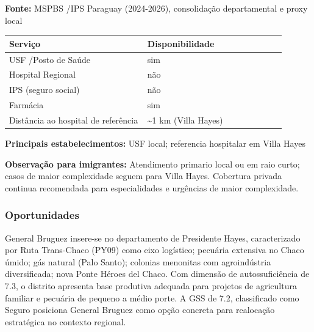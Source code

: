 \textbf{Fonte:} MSPBS /\allowbreak  IPS Paraguay (2024-2026), consolidação
departamental e proxy local

{\def\LTcaptype{none} %
\begin{longtable}{@{}>{\raggedright\arraybackslash}p{0.45\linewidth} >{\raggedright\arraybackslash}p{0.45\linewidth}@{}}
\toprule\noalign{}
Serviço & Disponibilidade \\
\midrule\noalign{}
\endhead
\bottomrule\noalign{}
\endlastfoot
USF /\allowbreak  Posto de Saúde & sim \\
Hospital Regional & não \\
IPS (seguro social) & não \\
Farmácia & sim \\
Distância ao hospital de referência & \textasciitilde1 km (Villa
Hayes) \\
\end{longtable}
}

\textbf{Principais estabelecimentos:} USF local; referencia hospitalar
em Villa Hayes

\textbf{Observação para imigrantes:} Atendimento primario local ou em
raio curto; casos de maior complexidade seguem para Villa Hayes.
Cobertura privada continua recomendada para especialidades e urgências
de maior complexidade.
\newpage

\subsubsection*{Oportunidades}\label{oport-general-bruguez-1509}
General Bruguez insere-se no departamento de Presidente Hayes, caracterizado por Ruta Trans-Chaco (PY09) como eixo logístico; pecuária extensiva no Chaco úmido; gás natural (Palo Santo); colonias menonitas com agroindústria diversificada; nova Ponte Héroes del Chaco. Com dimensão de autossuficiência de 7.3, o distrito apresenta base produtiva adequada para projetos de agricultura familiar e pecuária de pequeno a médio porte. A GSS de 7.2, classificado como Seguro posiciona General Bruguez como opção concreta para realocação estratégica no contexto regional.

